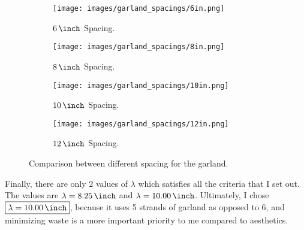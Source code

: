\begin{figure}[H]
    \centering
    \begin{subfigure}[t]{0.2\textwidth}
        \centering
        \texttt{[image: images/garland\_spacings/6in.png]}
        \caption{$\US{6}{\inch}$ Spacing.}
    \end{subfigure}
    \hspace*{0.05\textwidth}
    \begin{subfigure}[t]{0.2\textwidth}
        \centering
        \texttt{[image: images/garland\_spacings/8in.png]}
        \caption{$\US{8}{\inch}$ Spacing.}
    \end{subfigure}
    \hspace*{0.05\textwidth}
    \begin{subfigure}[t]{0.2\textwidth}
        \centering
        \texttt{[image: images/garland\_spacings/10in.png]}
        \caption{$\US{10}{\inch}$ Spacing.}
    \end{subfigure}
    \hspace*{0.05\textwidth}
    \begin{subfigure}[t]{0.2\textwidth}
        \centering
        \texttt{[image: images/garland\_spacings/12in.png]}
        \caption{$\US{12}{\inch}$ Spacing.}
    \end{subfigure}
    \caption{Comparison between different spacing for the garland. }
\end{figure}

Finally, there are only 2 values of $\lambda$ which satisfies all the criteria that I set out. The values are $\lambda=\US{8.25}{\inch}$ and $\lambda=\US{10.00}{\inch}$. Ultimately, I chose $\boxed{\mathbf{\lambda=\US{10.00}{\inch}}}$, because it uses 5 strands of garland as opposed to 6, and minimizing waste is a more important priority to me compared to aesthetics. 
